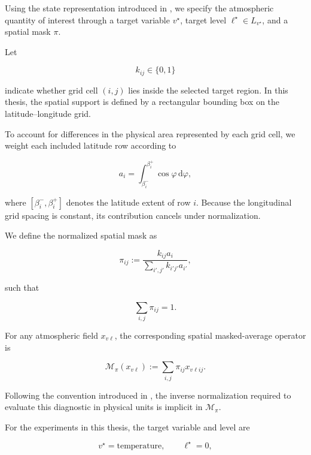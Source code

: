 Using the state representation introduced in
, we specify the atmospheric quantity of
interest through a target variable $v^\star$, target level
$\ell^\star\in L_{v^\star}$, and a spatial mask $\pi$.

Let

\[
    k_{ij}\in\{0,1\}
\]

indicate whether grid cell $(i,j)$ lies inside the selected target region.
In this thesis, the spatial support is defined by a rectangular bounding box
on the latitude--longitude grid.

To account for differences in the physical area represented by each grid
cell, we weight each included latitude row according to

\begin{equation}
    a_i
    =
    \int_{\beta_i^-}^{\beta_i^+}
    \cos\varphi\,\mathrm{d}\varphi,
    \label{eq:mask-cell-area}
\end{equation}

where $[\beta_i^-,\beta_i^+]$ denotes the latitude extent of row $i$.
Because the longitudinal grid spacing is constant, its contribution cancels
under normalization.

We define the normalized spatial mask as

\begin{equation}
    \pi_{ij}
    :=
    \frac{
        k_{ij}a_i
    }{
        \displaystyle
        \sum_{i',j'}
        k_{i'j'}a_{i'}
    },
    \label{eq:target-mask}
\end{equation}

such that

\[
    \sum_{i,j}\pi_{ij}=1.
\]

For any atmospheric field $x_{v\ell}$, the corresponding spatial
masked-average operator is

\begin{equation}
    \mathcal{M}_{\pi}(x_{v\ell})
    :=
    \sum_{i,j}
    \pi_{ij}x_{v\ell ij}.
    \label{eq:masked-average}
\end{equation}

Following the convention introduced in
, the inverse normalization required to
evaluate this diagnostic in physical units is implicit in
$\mathcal{M}_{\pi}$.

For the experiments in this thesis, the target variable and level are

\[
    v^\star=\mathrm{temperature},
    \qquad
    \ell^\star=0,
\]

